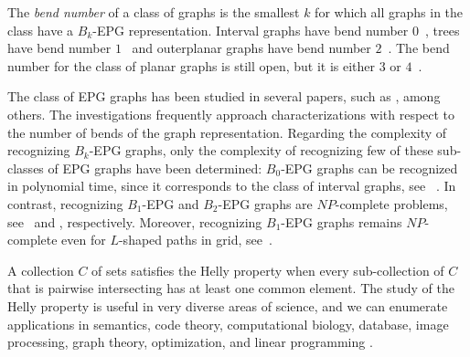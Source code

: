 \documentclass[
submission
]{dmtcs-episciences}
\begin{document}
The \emph{bend number} of a class of graphs is the smallest $k$ for which all graphs in the class have a $B_k$-EPG representation. Interval graphs have bend number $0$~\cite{golumbic2009}, trees have bend number $1$~\cite{golumbic2009} and outerplanar graphs have bend number $2$~\cite{daniel2014b}. The bend number for the class of planar graphs is still open, but it is either $ 3 $ or $4$~\cite{daniel2014b}.



The class of EPG graphs has been studied in several papers, such as \cite{alcon2016, Asinowski2009, cohen2014, golumbic2009, heldt2014,  martin2017}, among others. The investigations frequently approach characterizations with respect to the number of bends of the graph representation. Regarding the complexity of recognizing $B_k$-EPG graphs, only the complexity of recognizing few of these sub-classes of EPG graphs have been determined: %
 $B_0$-EPG graphs can be recognized in polynomial time, since it corresponds to the class of interval graphs, see ~\cite{booth1976}. In contrast, recognizing $B_1$-EPG and $B_2$-EPG graphs are $NP$-complete problems, see~\cite{heldt2014} and \cite{martin2017}, respectively. Moreover, recognizing $B_1$-EPG graphs  remains $NP$-complete even for $L$-shaped paths in grid, see~\cite{cameron2016edge}.

%


A  collection $C$ of sets satisfies the Helly property when every sub-collection of $ C $ that is pairwise intersecting has at least one common element. %
The study of the Helly property is useful in very diverse areas of science, and we can enumerate applications in semantics, code theory, computational biology, database, image processing, graph theory, optimization, and linear programming \cite{dourado2009}.

\end{document}

